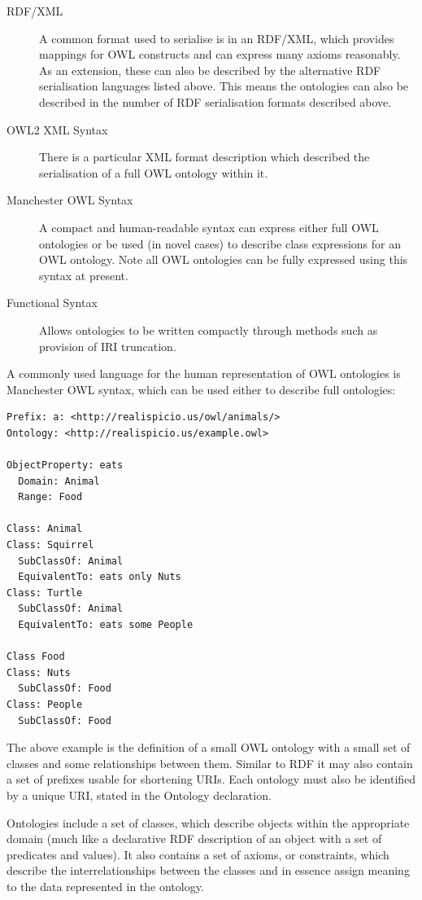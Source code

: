 \documentclass{article}
\begin{document}
\begin{description}
    \item[RDF/XML] A common format used to serialise is in an RDF/XML, which
    provides mappings for OWL constructs and can express many axioms
    reasonably. As an extension, these can also be described by the alternative
    RDF serialisation languages listed above. This means the ontologies can also
    be described in the number of RDF serialisation formats described above.
    \item[OWL2 XML Syntax] There is a particular XML format description which
    described the serialisation of a full OWL ontology within it.\cite{owl2xml}
    \item[Manchester OWL Syntax] A compact and human-readable syntax can express
    either full OWL ontologies or be used (in novel cases) to describe class
    expressions for an OWL ontology. Note all OWL ontologies can be fully
    expressed using this syntax at present.\cite{manchesterowl}
    \item[Functional Syntax] Allows ontologies to be written compactly through
    methods such as provision of IRI truncation.
\end{description}

A commonly used language for the human representation of OWL ontologies is
Manchester OWL syntax, which can be used either to describe full ontologies:

\begin{lstlisting}
Prefix: a: <http://realispicio.us/owl/animals/>
Ontology: <http://realispicio.us/example.owl>

ObjectProperty: eats
  Domain: Animal
  Range: Food

Class: Animal
Class: Squirrel
  SubClassOf: Animal
  EquivalentTo: eats only Nuts
Class: Turtle
  SubClassOf: Animal
  EquivalentTo: eats some People

Class Food
Class: Nuts
  SubClassOf: Food
Class: People
  SubClassOf: Food
\end{lstlisting}

The above example is the definition of a small OWL ontology with a small set of 
classes and some relationships between them. Similar to RDF it
may also contain a set of prefixes usable for shortening URIs. Each ontology
must also be identified by a unique URI, stated in the Ontology declaration.

Ontologies include a set of classes, which describe objects within the appropriate 
domain (much like a declarative RDF description of an object with a set of predicates 
and values). It also contains a set of axioms, or constraints, which describe the 
interrelationships between the classes and in essence assign meaning to the
data represented in the ontology.
\end{document}
